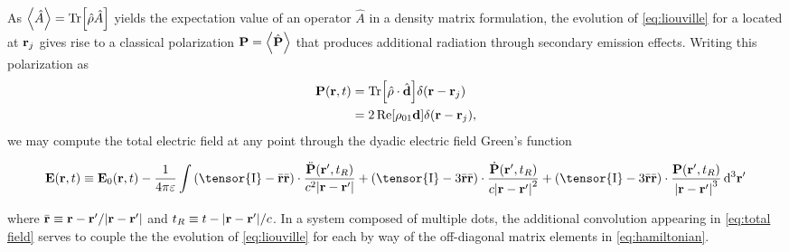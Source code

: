 As $\expval{\hat{A}} = \Tr[\hat{\rho}\hat{A}]$ yields the expectation value of an operator $\hat{A}$ in a density matrix formulation, the evolution of \cref{eq:liouville} for a \qd{} located at $\vb{r}_j$ gives rise to a classical polarization $\vb{P} = \expval{\hat{\vb{P}}}$ that produces additional radiation through secondary emission effects.
Writing this polarization as
\begin{equation}
  \begin{aligned}
    \vb{P}(\vb{r}, t) &= \Tr[\hat{\rho} \cdot \hat{\vb{d}}] \delta(\vb{r} - \vb{r}_j) \\
                      &= 2 \Re[\rho_{01}\vb{d}]\delta(\vb{r} - \vb{r}_j),
  \end{aligned}
\end{equation}
we may compute the total electric field at any point through the dyadic electric field Green's function~\cite{Rothwell2009}
\begin{widetext}
  \begin{equation}
    \vb{E}(\vb{r}, t) \equiv \vb{E}_0(\vb{r}, t) - \frac{1}{4\pi\varepsilon} \int
      \qty(\tensor{\mathrm{I}} - \bar{\vb{r}} \bar{\vb{r}}) \cdot \frac{\ddot{\vb{P}}(\vb{r}', t_R)}{c^2\abs{\vb{r} - \vb{r}'}} +
      \qty(\tensor{\mathrm{I}} - 3\bar{\vb{r}} \bar{\vb{r}}) \cdot \frac{\dot{\vb{P}}(\vb{r}', t_R)}{c\abs{\vb{r} - \vb{r}'}^2} +
      \qty(\tensor{\mathrm{I}} - 3\bar{\vb{r}} \bar{\vb{r}}) \cdot \frac{\vb{P}(\vb{r}', t_R)}{\abs{\vb{r} - \vb{r}'}^3}
    \dd[3]{\vb{r}'}
    \label{eq:total field}
  \end{equation}
\end{widetext}
where $\bar{\vb{r}} \equiv \vb{r} - \vb{r}'/\abs{\vb{r} - \vb{r}'}$ and $t_R \equiv t - \abs{\vb{r} - \vb{r}'}/c$.
In a system composed of multiple dots, the additional convolution appearing in \cref{eq:total field} serves to couple the the evolution of \cref{eq:liouville} for each \qd{} by way of the off-diagonal matrix elements in \cref{eq:hamiltonian}.
